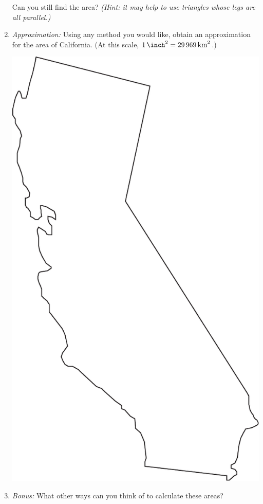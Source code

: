 \documentclass[12pt]{article}
\begin{document}
\begin{enumerate}
  Can you still find the area? \emph{(Hint: it may help to use
    triangles whose legs are all parallel.)}
  \clearpage
\item \emph{Approximation:} Using any method you would like, obtain an
  approximation for the area of California. (At this scale,
  $\SI{1}{\square\inch} = \SI{29969}{\square\kilo\meter}$.)
  \vspace{0.5in}
  \begin{center}
    \includegraphics{california.pdf}
  \end{center}
  \vspace{0.5in}
\item \emph{Bonus:} What other ways can you think of to calculate
  these areas?
\end{enumerate}
\end{document}
